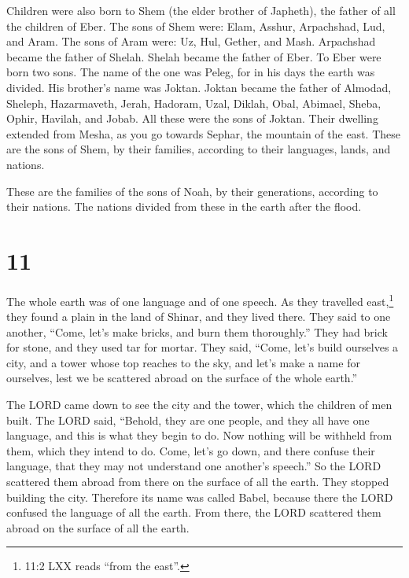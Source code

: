  Children were also born to Shem (the elder brother of
Japheth), the father of all the children of Eber.  The sons
of Shem were: Elam, Asshur, Arpachshad, Lud, and Aram.  The
sons of Aram were: Uz, Hul, Gether, and Mash.  Arpachshad
became the father of Shelah. Shelah became the father of Eber.
 To Eber were born two sons. The name of the one was Peleg,
for in his days the earth was divided. His brother's name was Joktan.
 Joktan became the father of Almodad, Sheleph, Hazarmaveth,
Jerah,  Hadoram, Uzal, Diklah,  Obal, Abimael,
Sheba,  Ophir, Havilah, and Jobab. All these were the sons
of Joktan.  Their dwelling extended from Mesha, as you go
towards Sephar, the mountain of the east.  These are the
sons of Shem, by their families, according to their languages, lands,
and nations.

 These are the families of the sons of Noah, by their
generations, according to their nations. The nations divided from these
in the earth after the flood.

\hypertarget{section-10}{%
\section{11}\label{section-10}}

 The whole earth was of one language and of one speech.
 As they travelled east,\footnote{11:2 LXX reads ``from the
  east''.} they found a plain in the land of Shinar, and they lived
there.  They said to one another, ``Come, let's make bricks,
and burn them thoroughly.'' They had brick for stone, and they used tar
for mortar.  They said, ``Come, let's build ourselves a
city, and a tower whose top reaches to the sky, and let's make a name
for ourselves, lest we be scattered abroad on the surface of the whole
earth.''

 The LORD came down to see the city and the tower, which the
children of men built.  The LORD said, ``Behold, they are
one people, and they all have one language, and this is what they begin
to do. Now nothing will be withheld from them, which they intend to do.
 Come, let's go down, and there confuse their language, that
they may not understand one another's speech.''  So the LORD
scattered them abroad from there on the surface of all the earth. They
stopped building the city.  Therefore its name was called
Babel, because there the LORD confused the language of all the earth.
From there, the LORD scattered them abroad on the surface of all the
earth.

